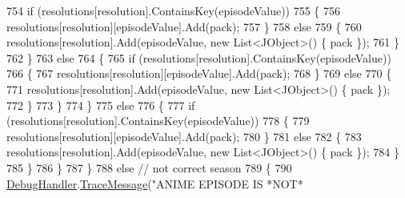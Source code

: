 \begin{DoxyCode}
754                                         \textcolor{keywordflow}{if} (resolutions[resolution].ContainsKey(episodeValue))
755                                         \{
756                                             resolutions[resolution][episodeValue].Add(pack);
757                                         \}
758                                         \textcolor{keywordflow}{else}
759                                         \{
760                                             resolutions[resolution].Add(episodeValue, \textcolor{keyword}{new} List<JObject>() \{
       pack \});
761                                         \}
762                                     \}
763                                     \textcolor{keywordflow}{else}
764                                     \{
765                                         \textcolor{keywordflow}{if} (resolutions[resolution].ContainsKey(episodeValue))
766                                         \{
767                                             resolutions[resolution][episodeValue].Add(pack);
768                                         \}
769                                         \textcolor{keywordflow}{else}
770                                         \{
771                                             resolutions[resolution].Add(episodeValue, \textcolor{keyword}{new} List<JObject>() \{
       pack \});
772                                         \}
773                                     \}
774                                 \}
775                                 \textcolor{keywordflow}{else}
776                                 \{
777                                     \textcolor{keywordflow}{if} (resolutions[resolution].ContainsKey(episodeValue))
778                                     \{
779                                         resolutions[resolution][episodeValue].Add(pack);
780                                     \}
781                                     \textcolor{keywordflow}{else}
782                                     \{
783                                         resolutions[resolution].Add(episodeValue, \textcolor{keyword}{new} List<JObject>() \{ 
      pack \});
784                                     \}
785                                 \}
786                             \}
787                         \}
788                         \textcolor{keywordflow}{else} \textcolor{comment}{// not correct season}
789                         \{
790                             \mbox{\hyperlink{class_little_weeb_library_1_1_handlers_1_1_anime_profile_handler_a0b0ae3c3838d26351485e6dfc566a632}{DebugHandler}}.\mbox{\hyperlink{interface_little_weeb_library_1_1_handlers_1_1_i_debug_handler_a2e405bc3492e683cd3702fae125221bc}{TraceMessage}}(\textcolor{stringliteral}{"ANIME EPISODE IS *NOT*
}
\end{DoxyCode}
